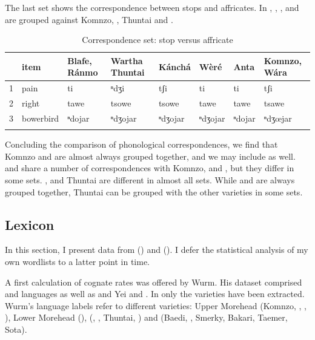 The last set shows the correspondence between stops and affricates. In , , ,  and  are grouped against Komnzo, ,  Thuntai and .

\begin{table}
\caption{Correspondence set: stop versus affricate}
\label{affrstop}
	\begin{tabularx}{\textwidth}{lllXllll}
		\lsptoprule
		&{item} &Blafe, Ránmo &Wartha Thuntai &Kánchá &Wèré &Anta &Komnzo, Wára\\\midrule
		1 &{pain} &ti &ⁿdʒi &tʃi &ti &ti &tʃi\\
		2 &{right} &tawe &tsowe &tsowe &tawe &tawe &tsawe\\
		3 &{bowerbird} &ⁿdojar &ⁿdʒojar &ⁿdʒojar &ⁿdʒojar &ⁿdojar &ⁿdʒœjar\\
		\lspbottomrule
	\end{tabularx}
\end{table}%

Concluding the comparison of phonological correspondences, we find that Komnzo and  are almost always grouped together, and we may include  as well.  and  share a number of correspondences with Komnzo,  and , but they differ in some sets. ,  and  Thuntai are different in almost all sets. While  and  are always grouped together,  Thuntai can be grouped with the other varieties in some sets.

\subsection{Lexicon}\label{comp-lex}

In this section, I present data from (\citealt{Wurm:1971uw}) and (\citealt{Clifton:1991fly}). I defer the statistical analysis of my own wordlists to a latter point in time.%

A first calculation of cognate rates was offered by Wurm. His dataset comprised  and  languages as well as and Yei and . In  only the  varieties have been extracted. Wurm's language labels refer to different  varieties: Upper Morehead (Komnzo, , , ), Lower Morehead (),  (, ,  Thuntai, ) and  (Baedi, , Smerky, Bakari, Taemer, Sota).

